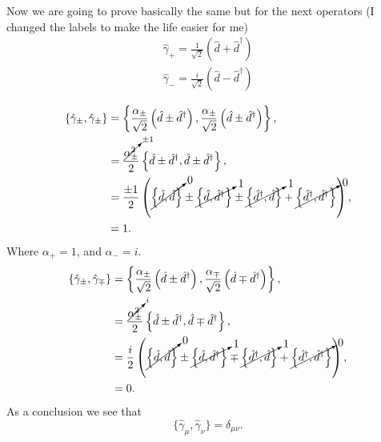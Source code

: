 \begin{questions}
\begin{solution}
  Now we are going to prove basically the same but for the next operators (I changed the labels to make the life easier for me)
  \begin{eqnarray}
    \hat{\gamma}_+ = \frac{1}{\sqrt{2}}\left(\hat{d} + \hat{d}^\dagger \right)\\
    \hat{\gamma}_- = \frac{i}{\sqrt{2}}\left(\hat{d} - \hat{d}^\dagger \right)
  \end{eqnarray}

  \begin{equation}
    \begin{aligned}[b]
      \{\hat{\gamma}_\pm,\hat{\gamma}_\pm \} &= \left\{\frac{\alpha_\pm}{\sqrt{2}}\left(\hat{d} \pm \hat{d}^\dagger \right),\frac{\alpha_\pm}{\sqrt{2}}\left(\hat{d} \pm \hat{d}^\dagger \right)\right\},\\
      &= \frac{\cancelto{\pm 1}{\alpha^2_\pm}}{2}\left\{\hat{d} \pm \hat{d}^\dagger ,\hat{d} \pm \hat{d}^\dagger \right\},\\
      &= \frac{\pm 1}{2}\left(\cancelto{0}{\left\{\hat{d} ,\hat{d} \right\}}  \pm \cancelto{1}{\left\{\hat{d}, \hat{d}^\dagger \right\}} \pm \cancelto{1}{\left\{  \hat{d}^\dagger ,\hat{d}\right\}} + \cancelto{0}{\left\{\hat{d}^\dagger ,\hat{d}^\dagger \right\}}\right),\\
      &= 1.
    \end{aligned}
  \end{equation}
  Where $\alpha_+ = 1$, and $\alpha_- = i$.
  \begin{equation}
    \begin{aligned}[b]
      \{\hat{\gamma}_\pm,\hat{\gamma}_\mp \} &= \left\{\frac{\alpha_\pm}{\sqrt{2}}\left(\hat{d} \pm \hat{d}^\dagger \right),\frac{\alpha_\mp}{\sqrt{2}}\left(\hat{d} \mp \hat{d}^\dagger \right)\right\},\\
      &= \frac{\cancelto{i}{\alpha^2_\pm}}{2}\left\{\hat{d} \pm \hat{d}^\dagger ,\hat{d} \mp \hat{d}^\dagger \right\},\\
      &= \frac{i}{2}\left(\cancelto{0}{\left\{\hat{d} ,\hat{d} \right\}}  \pm \cancelto{1}{\left\{\hat{d}, \hat{d}^\dagger \right\}} \mp \cancelto{1}{\left\{  \hat{d}^\dagger ,\hat{d}\right\}} + \cancelto{0}{\left\{\hat{d}^\dagger ,\hat{d}^\dagger \right\}}\right),\\
      &= 0.
    \end{aligned}
  \end{equation}
  As a conclusion we see that
  \begin{equation}
    \{\hat{\gamma}_\mu , \hat{\gamma}_\nu\} = \delta_{\mu \nu}.
    \label{commu}
  \end{equation}


\end{solution}
\end{questions}
